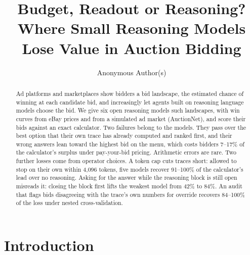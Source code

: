 \documentclass[sigconf,review,anonymous]{acmart}
\begin{document}
\title{Budget, Readout or Reasoning? Where Small Reasoning Models Lose Value in Auction Bidding}

\author{Anonymous Author(s)}

\begin{abstract}
Ad platforms and marketplaces show bidders a bid landscape, the estimated chance of winning at each candidate bid, and increasingly let agents built on reasoning language models choose the bid. We give six open reasoning models such landscapes, with win curves from eBay prices and from a simulated ad market (AuctionNet), and score their bids against an exact calculator. Two failures belong to the models. They pass over the best option that their own trace has already computed and ranked first, and their wrong answers lean toward the highest bid on the menu, which costs bidders 7--17\% of the calculator's surplus under pay-your-bid pricing. Arithmetic errors are rare. Two further losses come from operator choices. A token cap cuts traces short: allowed to stop on their own within 4{,}096 tokens, five models recover 91--100\% of the calculator's lead over no reasoning. Asking for the answer while the reasoning block is still open misreads it: closing the block first lifts the weakest model from 42\% to 84\%. An audit that flags bids disagreeing with the trace's own numbers for override recovers 84--100\% of the loss under nested cross-validation.
\end{abstract}



\maketitle

\section{Introduction}
\end{document}
